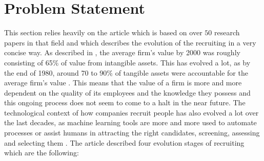 \documentclass[draft,final]{thesisclass} %
\begin{document}
\clearpage

\section{Problem Statement} \label{problem_statement}
This section relies heavily on the article \cite{ai_recruiting} which is based on over $50$ research papers in that field and which describes the evolution of the recruiting in a very concise way.
As described in \cite[1]{ai_recruiting}, the average firm's value by 2000 was roughly consisting of 65\% of value from intangible assets.
This has evolved a lot, as by the end of 1980, around 70 to 90\% of tangible assets were accountable for the average firm's value \cite[1]{ai_recruiting}.
This means that the value of a firm is more and more dependent on the quality of its employees and the knowledge they possess and this ongoing process does not seem to come to a halt in the near future.
The technological context of how companies recruit people has also evolved a lot over the last decades, as machine learning tools are more and more used to automate processes or assist humans in attracting the right candidates, screening, assessing and selecting them \cite[2]{ai_recruiting}.
The article \cite[2-4]{ai_recruiting} described four evolution stages of recruiting which are the following:
\end{document}
